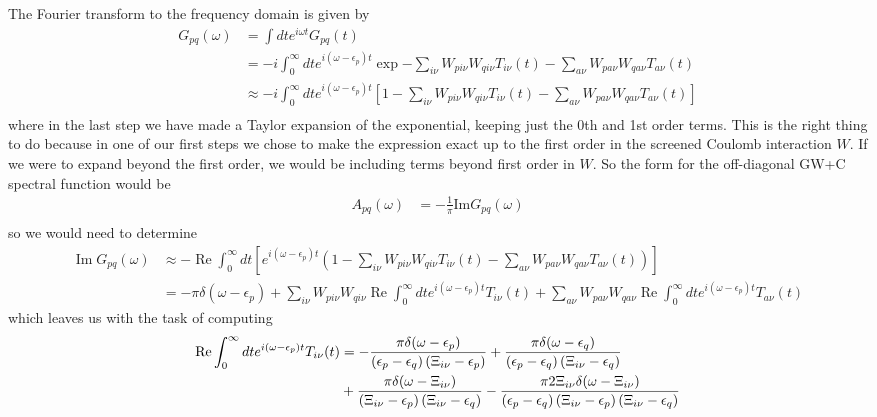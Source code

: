 The Fourier transform to the frequency domain is given by
\begin{align}
    G_{pq}(\omega) &= \int dt e^{i\omega t} G_{pq}(t) \\
&= -i \int_0^\infty dt e^{i(\omega - \epsilon_p) t} \exp{-\sum_{i\nu} W_{p i \nu} W_{q i \nu} T_{i\nu}(t) - \sum_{a\nu} W_{p a \nu} W_{q a \nu} T_{a\nu}(t)} \\
&\approx -i \int_0^\infty dt e^{i(\omega - \epsilon_p) t} \left[1- \sum_{i\nu} W_{p i \nu} W_{q i \nu} T_{i\nu}(t) - \sum_{a\nu} W_{p a \nu} W_{q a \nu} T_{a\nu}(t) \right] \\
\end{align}
where in the last step we have made a Taylor expansion of the exponential, keeping just the 0th and 1st order terms. This is the right thing to do because in one of our first steps we chose to make the expression exact up to the first order in the screened Coulomb interaction $W$. If we were to expand beyond the first order, we would be including terms beyond first order in $W$.
So the form for the off-diagonal GW+C spectral function would be
\begin{align}
    A_{pq}(\omega) &= -\frac{1}{\pi} \text{Im} G_{pq}(\omega) \\
\end{align}
so we would need to determine
\begin{align}
   \operatorname{Im}G_{pq}(\omega) &\approx - \operatorname{Re}\int_0^\infty dt \left[e^{i(\omega - \epsilon_p) t} \left(1 - \sum_{i\nu} W_{p i \nu} W_{q i \nu} T_{i\nu}(t) - \sum_{a\nu} W_{p a \nu} W_{q a \nu} T_{a\nu}(t) \right) \right] \\
&= - \pi \delta(\omega - \epsilon_p) + \sum_{i\nu} W_{p i \nu} W_{q i \nu} \operatorname{Re}\int_0^\infty dt e^{i(\omega - \epsilon_p) t} T_{i\nu}(t) + \sum_{a\nu} W_{p a \nu} W_{q a \nu} \operatorname{Re}\int_0^\infty dt e^{i(\omega - \epsilon_p) t} T_{a\nu}(t)
\end{align}
which leaves us with the task of computing
\begin{align}
    \operatorname{Re}\int_0^\infty dt e^{i(\omega - \epsilon_p) t} T_{i\nu}(t) &= -\frac{\pi\delta(\omega - \epsilon_p)}{\left(\epsilon_p-\epsilon_q\right)\left(\Xi_{i\nu}-\epsilon_p\right)} + \frac{\pi\delta(\omega - \epsilon_q)}{\left(\epsilon_p-\epsilon_q\right)\left(\Xi_{i\nu}-\epsilon_q\right)}\\
&  + \frac{\pi\delta(\omega - \Xi_{i\nu})}{\left(\Xi_{i\nu}-\epsilon_p\right)\left(\Xi_{i\nu}-\epsilon_q\right)}-\frac{\pi2\Xi_{i\nu}\delta(\omega - \Xi_{i\nu})}{\left(\epsilon_p-\epsilon_q\right)\left(\Xi_{i\nu}-\epsilon_p\right)\left(\Xi_{i\nu}-\epsilon_q\right)} \notag \\
\end{align}
